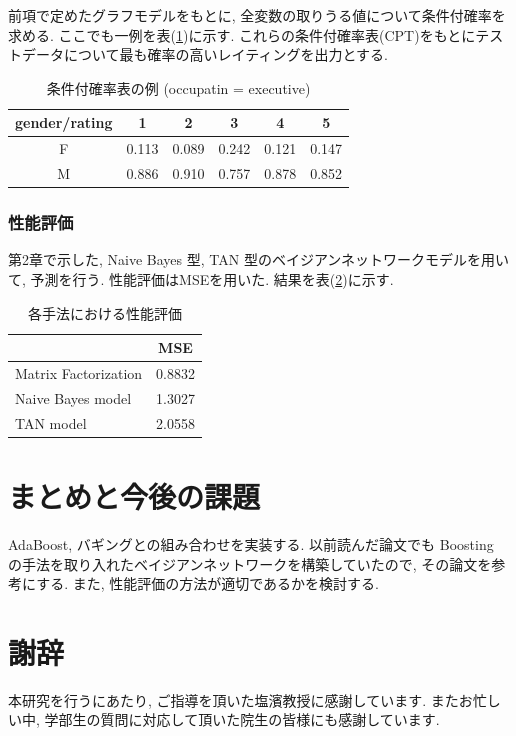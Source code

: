 \documentclass[a4paper]{jarticle}
\begin{document}
前項で定めたグラフモデルをもとに, 全変数の取りうる値について条件付確率を求める. ここでも一例を表(\ref{CPTsample})に示す. これらの条件付確率表(CPT)をもとにテストデータについて最も確率の高いレイティングを出力とする.

\begin{table}[H]
\begin{center}
\label{CPTsample}
\caption{条件付確率表の例 (occupatin = executive)}
\begin{tabular}{|c||c|c|c|c|c|} \hline  
gender/rating & 1 & 2 & 3 & 4 & 5 \\ \hline \hline
F & 0.113 & 0.089 & 0.242 & 0.121 & 0.147 \\
M & 0.886 & 0.910 & 0.757 & 0.878 & 0.852 \\ \hline
\end{tabular}
\end{center}
\end{table}

\subsubsection{性能評価}

第2章で示した, Naive Bayes 型, TAN 型のベイジアンネットワークモデルを用いて, 予測を行う. 性能評価はMSEを用いた. 結果を表(\ref{modelmse})に示す.

\begin{table}[H]
\begin{center}
\caption{各手法における性能評価}   %
\label{modelmse}   %
\begin{tabular}{l c}
\hline
                            & MSE \\ \hline
Matrix Factorization &  0.8832 \\ \hline
Naive Bayes model  & 1.3027 \\ \hline
TAN model             & 2.0558 \\ \hline
\end{tabular}
\end{center}
\end{table}

\section{まとめと今後の課題}

AdaBoost, バギングとの組み合わせを実装する. 以前読んだ論文でも Boosting の手法を取り入れたベイジアンネットワークを構築していたので, その論文を参考にする. また, 性能評価の方法が適切であるかを検討する. 

\section{謝辞}
本研究を行うにあたり, ご指導を頂いた塩濱教授に感謝しています. またお忙しい中, 学部生の質問に対応して頂いた院生の皆様にも感謝しています.

\newpage
{} %




\end{document}
